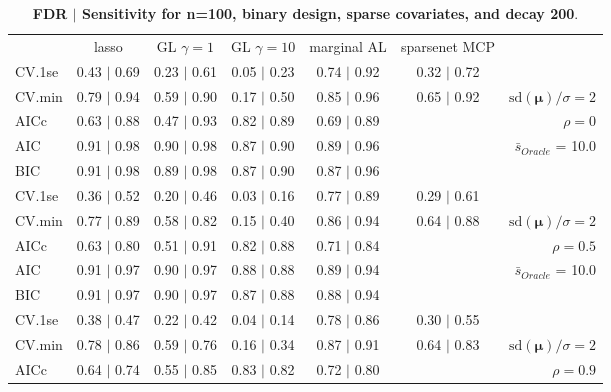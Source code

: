 \clearpage
\begin{table}\vspace{-.5cm}
\caption[l]{ {\it }
{ \bf FDR $\boldsymbol{\mid}$ Sensitivity for n=100, binary design, sparse covariates, and  decay  200}.}
\vspace{-.5cm}
\footnotesize{}
\begin{center}
\begin{tabular}{l*{5}{c}|r}
 & lasso & GL $\gamma=1$ & GL $\gamma=10$ & marginal AL & sparsenet MCP  & \\
 \cline{1-7}
CV.1se & 0.43 $\mid$ 0.69 & 0.23 $\mid$ 0.61 & 0.05 $\mid$ 0.23 & 0.74 $\mid$ 0.92 & 0.32 $\mid$ 0.72 & \\
CV.min & 0.79 $\mid$ 0.94 & 0.59 $\mid$ 0.90 & 0.17 $\mid$ 0.50 & 0.85 $\mid$ 0.96 & 0.65 $\mid$ 0.92 &  $\mathrm{sd}(\mathbf{\mu})/\sigma=2$ \\
AICc & 0.63 $\mid$ 0.88 & 0.47 $\mid$ 0.93 & 0.82 $\mid$ 0.89 & 0.69 $\mid$ 0.89 & & $\rho=0$ \\
AIC & 0.91 $\mid$ 0.98 & 0.90 $\mid$ 0.98 & 0.87 $\mid$ 0.90 & 0.89 $\mid$ 0.96 & &  \multirow{2}{*}{$\bar{s}_{Oracle}$ = 10.0} \\
BIC & 0.91 $\mid$ 0.98 & 0.89 $\mid$ 0.98 & 0.87 $\mid$ 0.90 & 0.87 $\mid$ 0.96 & &  \\
 \hline 
CV.1se & 0.36 $\mid$ 0.52 & 0.20 $\mid$ 0.46 & 0.03 $\mid$ 0.16 & 0.77 $\mid$ 0.89 & 0.29 $\mid$ 0.61 & \\
CV.min & 0.77 $\mid$ 0.89 & 0.58 $\mid$ 0.82 & 0.15 $\mid$ 0.40 & 0.86 $\mid$ 0.94 & 0.64 $\mid$ 0.88 &  $\mathrm{sd}(\mathbf{\mu})/\sigma=2$ \\
AICc & 0.63 $\mid$ 0.80 & 0.51 $\mid$ 0.91 & 0.82 $\mid$ 0.88 & 0.71 $\mid$ 0.84 & & $\rho=0.5$ \\
AIC & 0.91 $\mid$ 0.97 & 0.90 $\mid$ 0.97 & 0.88 $\mid$ 0.88 & 0.89 $\mid$ 0.94 & &  \multirow{2}{*}{$\bar{s}_{Oracle}$ = 10.0} \\
BIC & 0.91 $\mid$ 0.97 & 0.90 $\mid$ 0.97 & 0.87 $\mid$ 0.88 & 0.88 $\mid$ 0.94 & &  \\
 \hline 
CV.1se & 0.38 $\mid$ 0.47 & 0.22 $\mid$ 0.42 & 0.04 $\mid$ 0.14 & 0.78 $\mid$ 0.86 & 0.30 $\mid$ 0.55 & \\
CV.min & 0.78 $\mid$ 0.86 & 0.59 $\mid$ 0.76 & 0.16 $\mid$ 0.34 & 0.87 $\mid$ 0.91 & 0.64 $\mid$ 0.83 &  $\mathrm{sd}(\mathbf{\mu})/\sigma=2$ \\
AICc & 0.64 $\mid$ 0.74 & 0.55 $\mid$ 0.85 & 0.83 $\mid$ 0.82 & 0.72 $\mid$ 0.80 & & $\rho=0.9$ \\

\end{tabular}
\end{center}
\end{table}
